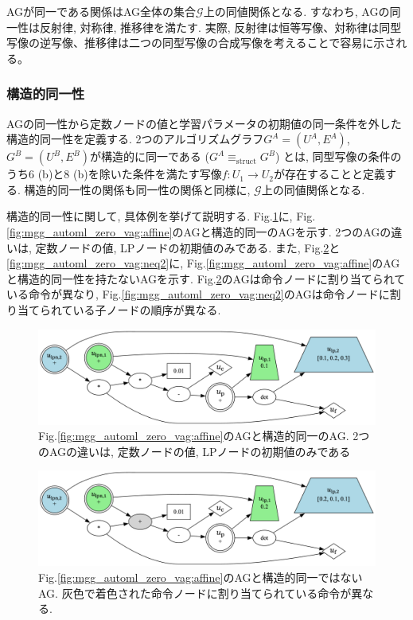 \documentclass[11pt,oneside,openany,report]{jsbook}
\begin{document}
\noindent
AGが同一である関係はAG全体の集合$\mathcal{G}$上の同値関係となる. すなわち, AGの同一性は反射律, 対称律, 推移律を満たす. 実際, 反射律は恒等写像、対称律は同型写像の逆写像、推移律は二つの同型写像の合成写像を考えることで容易に示される。

\subsubsection{構造的同一性}
AGの同一性から定数ノードの値と学習パラメータの初期値の同一条件を外した構造的同一性を定義する. 2つのアルゴリズムグラフ$G^A = (U^A, E^A)$, $G^B = (U^B, E^B)$が構造的に同一である ($G^A \equiv_\mathrm{struct} G^B$) とは, 同型写像の条件のうち6 (b)と8 (b)を除いた条件を満たす写像$ f: U_1 \rightarrow U_2 $が存在することと定義する. 構造的同一性の関係も同一性の関係と同様に, $\mathcal{G}$上の同値関係となる.

構造的同一性に関して, 具体例を挙げて説明する. Fig.\ref{fig:mgg_automl_zero_vag:eq1}に, Fig.\ref{fig:mgg_automl_zero_vag:affine}のAGと構造的同一のAGを示す. 2つのAGの違いは, 定数ノードの値, LPノードの初期値のみである. また, Fig.\ref{fig:mgg_automl_zero_vag:neq1}と\ref{fig:mgg_automl_zero_vag:neq2}に, Fig.\ref{fig:mgg_automl_zero_vag:affine}のAGと構造的同一性を持たないAGを示す. Fig.\ref{fig:mgg_automl_zero_vag:neq1}のAGは命令ノードに割り当てられている命令が異なり, Fig.\ref{fig:mgg_automl_zero_vag:neq2}のAGは命令ノードに割り当てられている子ノードの順序が異なる.

\begin{figure}
  \centering
  \includegraphics[width=14cm]{mgg_automl_zero_vag/ag/eq.png}
  \caption{Fig.\ref{fig:mgg_automl_zero_vag:affine}のAGと構造的同一のAG. 2つのAGの違いは, 定数ノードの値, LPノードの初期値のみである}
  \label{fig:mgg_automl_zero_vag:eq1}
\end{figure}

\begin{figure}
  \centering
  \includegraphics[width=14cm]{mgg_automl_zero_vag/ag/neq1.png}
  \caption{Fig.\ref{fig:mgg_automl_zero_vag:affine}のAGと構造的同一ではないAG. 灰色で着色された命令ノードに割り当てられている命令が異なる.}
  \label{fig:mgg_automl_zero_vag:neq1}
\end{figure}
\end{document}
